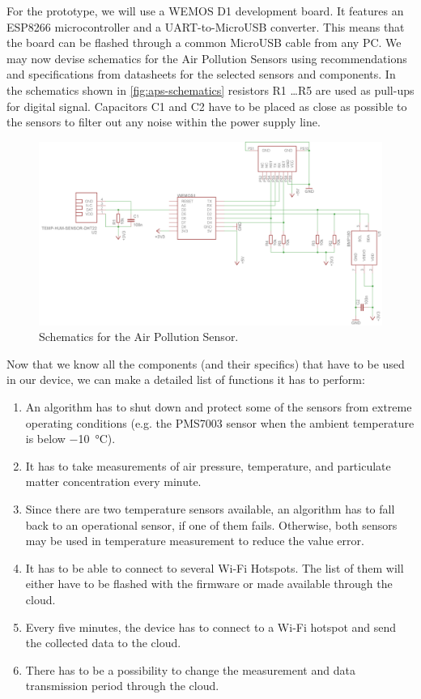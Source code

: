 \documentclass{article}
\begin{document}
			For the prototype, we will use a WEMOS D1 development board. It features an ESP8266 microcontroller and a UART-to-MicroUSB converter. This means that the board can be flashed through a common MicroUSB cable from any PC.
			We may now devise schematics for the Air Pollution Sensors using recommendations and specifications from datasheets for the selected sensors and components. In the schematics shown in \autoref{fig:aps-schematics} resistors R1 \ldots R5 are used as pull-ups for digital signal. Capacitors C1 and C2 have to be placed as close as possible to the sensors to filter out any noise within the power supply line.
			
			\begin{figure}[h]
				\includegraphics[width=\linewidth]{schematics.png}
				\caption{Schematics for the Air Pollution Sensor.}
				\label{fig:aps-schematics}
			\end{figure}
			
			Now that we know all the components (and their specifics) that have to be used in our device, we can make a detailed list of functions it has to perform:
			
			\begin{enumerate}
				\item An algorithm has to shut down and protect some of the sensors from extreme operating conditions (e.g. the PMS7003 sensor when the ambient temperature is below \SI{-10}{\celsius}).
				\item It has to take measurements of air pressure, temperature, and particulate matter concentration every minute.
				\item Since there are two temperature sensors available, an algorithm has to fall back to an operational sensor, if one of them fails. Otherwise, both sensors may be used in temperature measurement to reduce the value error.
				\item It has to be able to connect to several Wi-Fi Hotspots. The list of them will either have to be flashed with the firmware or made available through the cloud.
				\item Every five minutes, the device has to connect to a Wi-Fi hotspot and send the collected data to the cloud.
				\item There has to be a possibility to change the measurement and data transmission period through the cloud.
			\end{enumerate}
			
\end{document}

